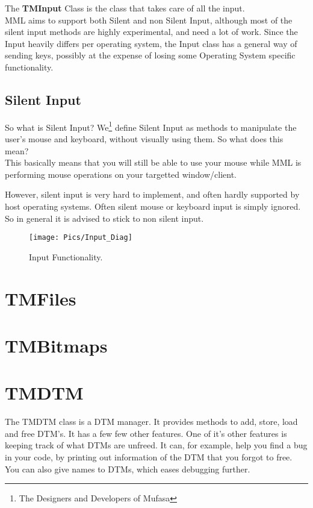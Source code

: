 \documentclass[a4paper]{report}
\begin{document}
The \textbf{TMInput} Class is the class that takes care of all the input. \\
MML aims to support both Silent and non Silent Input, although most of the
silent input methods are highly experimental, and need a lot of work.
Since the Input heavily differs per operating system, 
the Input class has a general way of sending keys, possibly at the expense
of losing some Operating System specific functionality.

\subsection{Silent Input}

So what is Silent Input?
We\footnote{The Designers and Developers of Mufasa} define Silent Input as
methods to manipulate the user's mouse and keyboard, without visually using
them. So what does this mean? \\

This basically means that you will still be able to use your mouse while
MML is performing mouse operations on your targetted window/client.

However, silent input is very hard to implement, and often hardly supported
by host operating systems. Often silent mouse or keyboard input is simply 
ignored. So in general it is advised to stick to non silent input.

\begin{figure}[ht]
	\texttt{[image: Pics/Input\_Diag]}
	\caption{Input Functionality.}
\end{figure}

\section{TMFiles}

\section{TMBitmaps}

\section{TMDTM}

The TMDTM class is a DTM manager. It provides methods to add, store, load
and free DTM's. It has a few few other features. One of it's other features
is keeping track of what DTMs are unfreed. It can, for example, help you find
a bug in your code, by printing out information of the DTM that you forgot to
free. You can also give names to DTMs, which eases debugging further.
\end{document}
